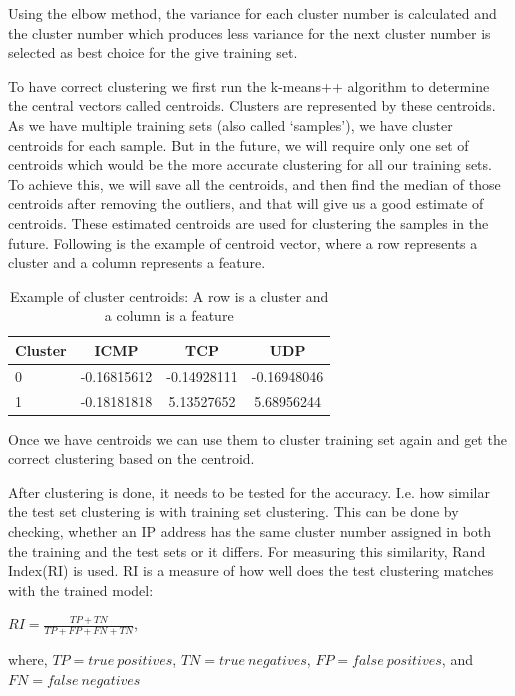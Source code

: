 \documentclass[12pt,oneside,a4paper]{article}
\begin{document}
Using the elbow method, the variance for each cluster number is calculated and the cluster number which produces less variance for the next cluster number is selected as best choice for the give training set.

To have correct clustering we first run the k-means++ algorithm to determine the central vectors called centroids. Clusters are represented by these centroids. As we have multiple training sets (also called `samples'), we have cluster centroids for each sample. But in the future, we will require only one set of centroids which would be the more accurate clustering for all our training sets. To achieve this, we will save all the centroids, and then find the median of those centroids after removing the outliers, and that will give us a good estimate of centroids. These estimated centroids are used for clustering the samples in the future. Following is the example of centroid vector, where a row represents a cluster and a column represents a feature.

\begin{table}[H]
\centering
  \begin{tabular}{ l | c  c  c }
    Cluster      & ICMP  & TCP  & UDP \\
    \hline
    0         &{-0.16815612}       &{-0.14928111}    &{-0.16948046} \\
    1         &{-0.18181818}       &{5.13527652}     &{5.68956244} \\
  \end{tabular}
\caption{Example of cluster centroids: A row is a cluster and a column is a feature} \label{table:centroids-example}
\end{table}

Once we have centroids we can use them to cluster training set again and get the correct clustering based on the centroid.

After clustering is done, it needs to be tested for the accuracy. I.e. how similar the test set clustering is with training set clustering. This can be done by checking, whether an IP address has the same cluster number assigned in both the training and the test sets or it differs. For measuring this similarity, Rand Index(RI)\cite{ri-index} is used. RI is a measure of how well does the test clustering matches with the trained model:

\hspace{4cm} $RI={\frac {TP+TN}{TP+FP+FN+TN}}$,

where,
$TP= true\ positives$, $TN=true\ negatives$, $FP= false\ positives$, and $FN= false\ negatives$
\end{document}
